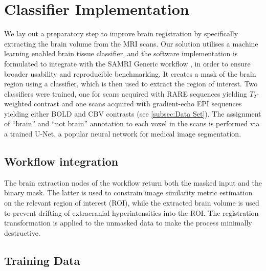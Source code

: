 \section{Classifier Implementation}
We lay out a preparatory step to improve brain registration by specifically extracting the brain volume from the MRI scans.
Our solution utilises a machine learning enabled brain tissue classifier, and the software implementation is formulated to integrate with the SAMRI Generic workflow \cite{ioanas_optimized_2019}, in order to ensure broader usability and reproducible benchmarking.
It creates a mask of the brain region using a classifier, which is then used to extract the region of interest.
Two classifiers were trained, one for scans acquired with RARE sequences yielding $T_2$-weighted contrast and one scans acquired with gradient-echo EPI sequences yielding either BOLD \cite{bold} and CBV \cite{cbv} contrasts (see \cref{subsec:Data Set}).
The assignment of “brain” and “not brain” annotation to each voxel in the scans is performed via a trained U-Net, a popular neural network for medical image segmentation.

\subsection{Workflow integration}
The brain extraction nodes of the workflow return both the masked input and the binary mask.
The latter is used to constrain image similarity metric estimation on the relevant region of interest (ROI), while the extracted brain volume is used to prevent drifting of extracranial hyperintensities into the ROI.
The registration transformation is applied to the unmasked data to make the process minimally destructive.

\subsection{Training Data}

